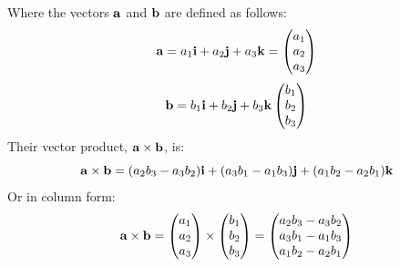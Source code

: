         \begin{theorem}
            Where the vectors $\normalfont\mathbf{a}$ and $\normalfont\mathbf{b}$ are defined as follows:
            \begin{equation*}
                \normalfont{\mathbf{a}}=a_1\normalfont{\mathbf{i}}+a_2\normalfont{\mathbf{j}}+a_3\normalfont{\mathbf{k}}=
                \begin{pmatrix}
                    a_1 \\ a_2 \\ a_3
                \end{pmatrix}
            \end{equation*}
            \begin{equation*}
                \normalfont{\mathbf{b}}=b_1\normalfont{\mathbf{i}}+b_2\normalfont{\mathbf{j}}+b_3\normalfont{\mathbf{k}}
                \begin{pmatrix}
                    b_1 \\ b_2 \\ b_3
                \end{pmatrix}
            \end{equation*}
            Their vector product, $\normalfont{\mathbf{a}}\times\normalfont{\mathbf{b}}$, is:
            \begin{equation} \label{vector_product_ijk_form}
                \normalfont{\mathbf{a}}\times\normalfont{\mathbf{b}}=(a_2b_3-a_3b_2)\normalfont{\mathbf{i}}+(a_3b_1-a_1b_3)\normalfont{\mathbf{j}}+(a_1b_2-a_2b_1)\normalfont{\mathbf{k}}
            \end{equation}
            Or in column form:
            \begin{equation} \label{eq:vector_product_column_form}
                \normalfont{\mathbf{a}}\times\normalfont{\mathbf{b}}=
                \begin{pmatrix}
                    a_1 \\ a_2 \\ a_3
                \end{pmatrix}
                \times
                \begin{pmatrix}
                    b_1 \\ b_2 \\ b_3
                \end{pmatrix}
                =
                \begin{pmatrix}
                    a_2b_3-a_3b_2 \\
                    a_3b_1-a_1b_3 \\
                    a_1b_2-a_2b_1
                \end{pmatrix}
            \end{equation}
        \end{theorem}
